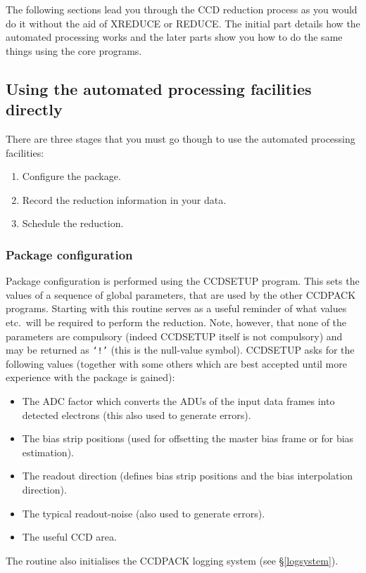 \documentclass[twoside,11pt]{article}
\newcommand{\hyperref}[4]{#2\ref{#4}#3}
\newcommand{\htmlref}[2]{#1}
\newcommand{\latexhtml}[2]{#1}
\newcommand{\xlabel}[1]{}
\renewcommand{\_}{\texttt{\symbol{95}}}
\newcommand{\ttsize}{\latexhtml{\small}{}}
\newcommand{\text}[1]{{\ttsize \tt #1}}
\newcommand{\routine}[1]{{\sc #1}}
\newcommand{\xroutine}[1]{\htmlref{{\sc #1}}{#1}}
\begin{document}
The following sections lead you through the CCD reduction process as
you would do it without the aid of \xroutine{XREDUCE} or
\xroutine{REDUCE}.
The initial part details how the automated processing works and the
later parts show you how to do the same things using the core programs.

\subsection{Using the automated processing facilities directly}

There are three stages that you must go though to use the automated
processing facilities:
\begin{enumerate}
\item Configure the package.
\item Record the reduction information in your data.
\item Schedule the reduction.
\end{enumerate}

\subsubsection{Package configuration\xlabel{configuration}
               \label{configuration}}
Package configuration is performed using the \xroutine{CCDSETUP}
program.
This sets the values of a sequence of global parameters, that are used
by the other CCDPACK programs.
Starting with this routine serves as a useful reminder of what values
etc.\ will be required to perform the reduction.
Note, however, that none of the parameters are compulsory (indeed
\routine{CCDSETUP} itself is not compulsory) and may be returned as \text{`!'}
(this is the null-value symbol).
\routine{CCDSETUP} asks for the following values (together with some others
which are best accepted until more experience with the package is
gained):
\begin{itemize}
\item The ADC factor which converts the
ADUs of the input data frames into detected electrons (this also
used to generate errors).
\item The bias strip positions (used for offsetting the master bias
frame or for bias estimation).
\item The readout direction (defines bias strip positions and the
bias interpolation direction).
\item The typical readout-noise (also used to generate errors).
\item The useful CCD area.
\end{itemize}
The routine also initialises the CCDPACK logging system (see
\hyperref{later}{\S}{}{logsystem}).
\end{document}
